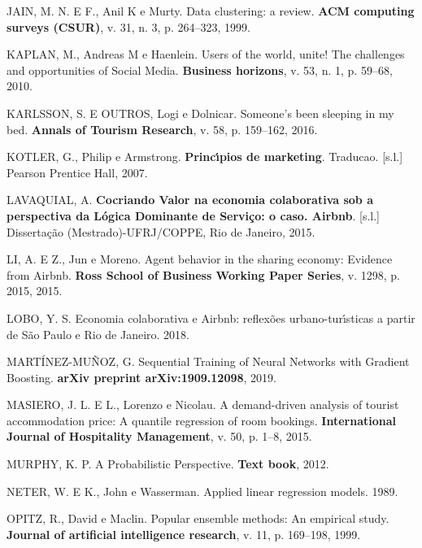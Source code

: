\documentclass[
	12pt,				%
	a4paper,		%
	oneside,    %
	chapter=TITLE,		   %
	section=TITLE,		   %
	subsection=TITLE,	   %
	subsubsection=TITLE, %
	english,			%
	french,				%
	spanish,			%
	brazil,				%
]{abntex2}
\begin{document}
\leavevmode\hypertarget{ref-jain1999data}{}%
JAIN, M. N. E F., Anil K e Murty. Data clustering: a review. \textbf{ACM
computing surveys (CSUR)}, v. 31, n. 3, p. 264--323, 1999.

\leavevmode\hypertarget{ref-kaplan2010users}{}%
KAPLAN, M., Andreas M e Haenlein. Users of the world, unite! The
challenges and opportunities of Social Media. \textbf{Business
horizons}, v. 53, n. 1, p. 59--68, 2010.

\leavevmode\hypertarget{ref-karlsson2016someone}{}%
KARLSSON, S. E OUTROS, Logi e Dolnicar. Someone's been sleeping in my
bed. \textbf{Annals of Tourism Research}, v. 58, p. 159--162, 2016.

\leavevmode\hypertarget{ref-kotler2007principios}{}%
KOTLER, G., Philip e Armstrong. \textbf{Princı́pios de marketing}.
Traducao. {[}s.l.{]} Pearson Prentice Hall, 2007.

\leavevmode\hypertarget{ref-lavaquial2015cocriando}{}%
LAVAQUIAL, A. \textbf{Cocriando Valor na economia colaborativa sob a
perspectiva da Lógica Dominante de Serviço: o caso. Airbnb}. {[}s.l.{]}
Dissertação (Mestrado)-UFRJ/COPPE, Rio de Janeiro, 2015.

\leavevmode\hypertarget{ref-li2015agent}{}%
LI, A. E Z., Jun e Moreno. Agent behavior in the sharing economy:
Evidence from Airbnb. \textbf{Ross School of Business Working Paper
Series}, v. 1298, p. 2015, 2015.

\leavevmode\hypertarget{ref-loboeconomia}{}%
LOBO, Y. S. Economia colaborativa e Airbnb: reflexões urbano-turı́sticas
a partir de São Paulo e Rio de Janeiro. 2018.

\leavevmode\hypertarget{ref-martinez2019sequential}{}%
MARTÍNEZ-MUÑOZ, G. Sequential Training of Neural Networks with Gradient
Boosting. \textbf{arXiv preprint arXiv:1909.12098}, 2019.

\leavevmode\hypertarget{ref-masiero2015demand}{}%
MASIERO, J. L. E L., Lorenzo e Nicolau. A demand-driven analysis of
tourist accommodation price: A quantile regression of room bookings.
\textbf{International Journal of Hospitality Management}, v. 50, p.
1--8, 2015.

\leavevmode\hypertarget{ref-murphy2012probabilistic}{}%
MURPHY, K. P. A Probabilistic Perspective. \textbf{Text book}, 2012.

\leavevmode\hypertarget{ref-neter1989applied}{}%
NETER, W. E K., John e Wasserman. Applied linear regression models.
1989.

\leavevmode\hypertarget{ref-opitz1999popular}{}%
OPITZ, R., David e Maclin. Popular ensemble methods: An empirical study.
\textbf{Journal of artificial intelligence research}, v. 11, p.
169--198, 1999.
\end{document}
